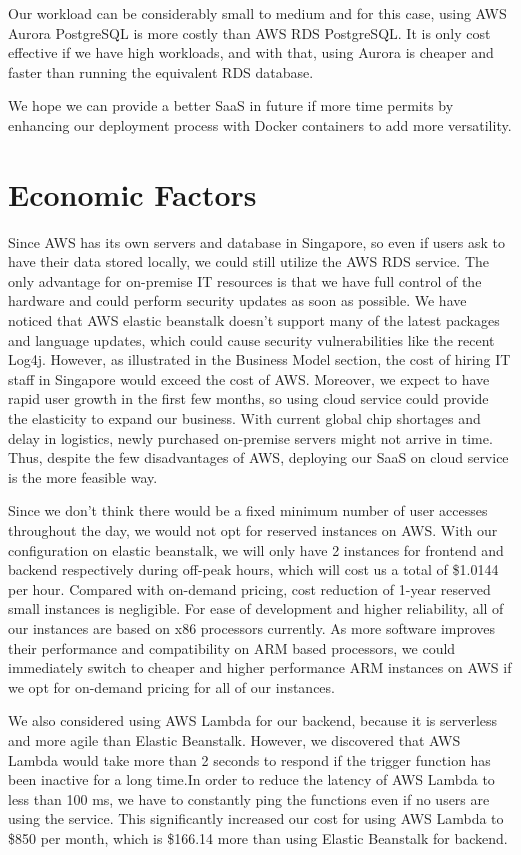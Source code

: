 \documentclass[12pt,a4paper]{article}
\begin{document}
        Our workload can be considerably small to medium and for this case, using AWS Aurora PostgreSQL is more costly than AWS RDS PostgreSQL. It is only cost effective if we have high workloads, and with that, using Aurora is cheaper and faster than running the equivalent RDS database.
        
        We hope we can provide a better SaaS in future if more time permits by enhancing our deployment process with Docker containers to add more versatility.

\section{Economic Factors}

Since AWS has its own servers and database in Singapore, so even if users ask to have their data stored locally, we could still utilize the AWS RDS service. The only advantage for on-premise IT resources is that we have full control of the hardware and could perform security updates as soon as possible. We have noticed that AWS elastic beanstalk doesn’t support many of the latest packages and language updates, which could cause security vulnerabilities like the recent Log4j. However, as illustrated in the Business Model section, the cost of hiring IT staff in Singapore would exceed the cost of AWS. Moreover, we expect to have rapid user growth in the first few months, so using cloud service could provide the elasticity to expand our business. With current global chip shortages and delay in logistics, newly purchased on-premise servers might not arrive in time. Thus, despite the few disadvantages of AWS, deploying our SaaS on cloud service is the more feasible way.

Since we don’t think there would be a fixed minimum number of user accesses throughout the day, we would not opt for reserved instances on AWS. With our configuration on elastic beanstalk, we will only have 2 instances for frontend and backend respectively during off-peak hours, which will cost us a total of \$1.0144 per hour. Compared with on-demand pricing, cost reduction of 1-year reserved small instances is negligible. For ease of development and higher reliability, all of our instances are based on x86 processors currently. As more software improves their performance and compatibility on ARM based processors, we could immediately switch to cheaper and higher performance ARM instances on AWS if we opt for on-demand pricing for all of our instances.

We also considered using AWS Lambda for our backend, because it is serverless and more agile than Elastic Beanstalk. However, we discovered that AWS Lambda would take more than 2 seconds to respond if the trigger function has been inactive for a long time.In order to reduce the latency of AWS Lambda to less than 100 ms, we have to constantly ping the functions even if no users are using the service. This significantly increased our cost for using AWS Lambda to \$850 per month, which is \$166.14 more than using Elastic Beanstalk for backend. 
\end{document}

